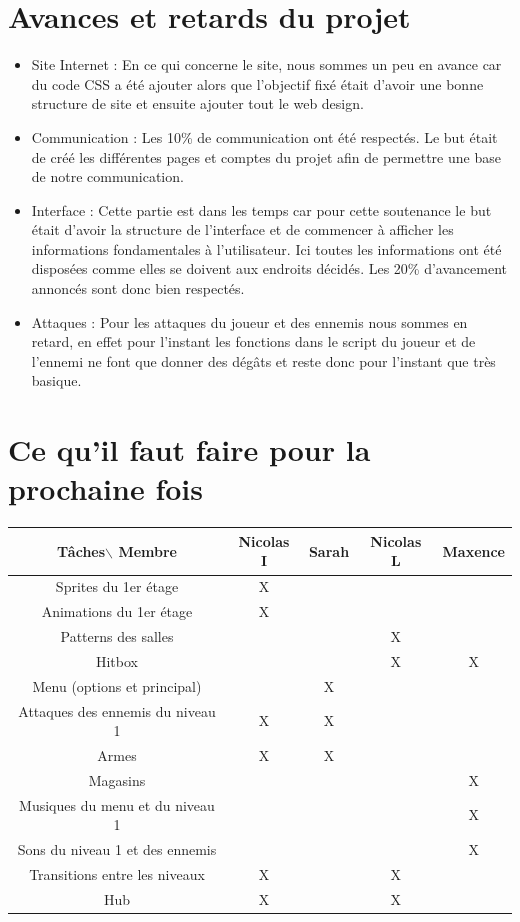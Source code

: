 \documentclass[]{extarticle}
\begin{document}
\begin{spacing}{1.25}
\section{Avances et retards du projet}
\bigbreak
\bigbreak
\bigbreak
\begin{itemize}
\item Site Internet : En ce qui concerne le site, nous sommes un peu en avance car du code CSS a été ajouter alors que l’objectif fixé était d’avoir une bonne structure de site et ensuite ajouter tout le web design. 
\bigbreak
\bigbreak
\item Communication : Les 10\% de communication ont été respectés. Le but était de créé les différentes pages et comptes du projet afin de permettre une base de notre communication. 
\bigbreak
\bigbreak
\item Interface : Cette partie est dans les temps car pour cette soutenance le but était d’avoir la structure de l’interface et de commencer à afficher les informations fondamentales à l’utilisateur. Ici toutes les informations ont été disposées comme elles se doivent aux endroits décidés. Les 20\% d’avancement annoncés sont donc bien respectés. 
\bigbreak
\bigbreak
\item Attaques : Pour les attaques du joueur et des ennemis nous sommes en retard, en effet pour l’instant les fonctions dans le script du joueur et de l’ennemi ne font que donner des dégâts et reste donc pour l’instant que très basique.
\end{itemize}
\newpage

\section{Ce qu'il faut faire pour la prochaine fois}
\bigbreak
\bigbreak
\begin{tabular}{|*{5}{c|}}
	\hline
	Tâches$\backslash$ Membre & Nicolas I & Sarah & Nicolas L & Maxence \\
	\hline	
	Sprites du 1er étage & X & & &  \\
	\hline
	Animations du 1er étage & X & & & \\
	\hline
	Patterns des salles & & & X & \\
	\hline
	Hitbox & & & X & X \\
	\hline
	Menu (options et principal) & & X & & \\
	\hline
	Attaques des ennemis du niveau 1 & X & X & & \\
	\hline
	Armes & X & X & & \\
	\hline
	Magasins & & & & X \\
	\hline
	Musiques du menu et du niveau 1 & & & & X\\
	\hline
	Sons du niveau 1 et des ennemis & & & & X \\
	\hline
	Transitions entre les niveaux & X & & X & \\
	\hline
	Hub & X & & X & \\
	\hline
\end{tabular}
\bigbreak
\bigbreak
\bigbreak
\bigbreak


\end{spacing}
\end{document}
